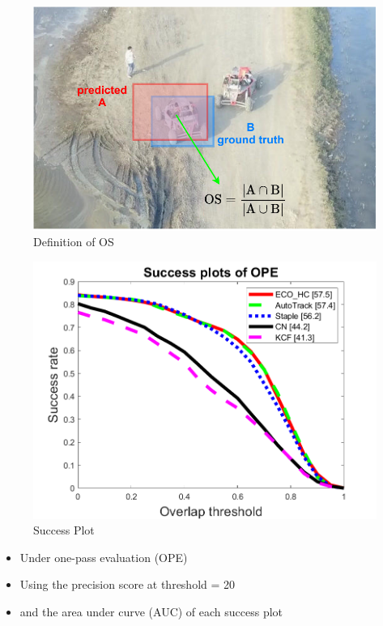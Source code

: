 \documentclass{beamer}
\begin{document}
\begin{frame}
    \begin{figure}[htpb]
        \begin{center}
            \includegraphics[width=0.8\linewidth]{fig/OS.pdf}
            \caption{Definition of OS}
        \end{center}
    \end{figure}
\end{frame}

\begin{frame}
    \begin{figure}[htpb]
        \begin{center}
            \includegraphics[width=0.8\linewidth]{fig/auc.png}
            \caption{Success Plot}
        \end{center}
    \end{figure}
\end{frame}

\begin{frame}
    \begin{itemize}[<+-| alert@+>]
        \item Under one-pass evaluation (OPE)
        \item Using the precision score at threshold = 20
        \item and the area under curve (AUC) of each success plot
    \end{itemize}
\end{frame}
\end{document}
